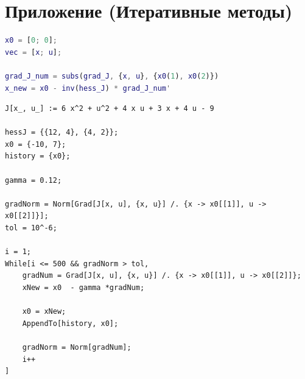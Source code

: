 \documentclass[a4paper,12pt]{article}
\begin{document}
\newpage
\section*{Приложение (Итеративные методы)}
\begin{lstlisting}[caption={Метод Ньютона (без цикла)}, language=matlab, label={lst:newton}]
x0 = [0; 0];
vec = [x; u];

grad_J_num = subs(grad_J, {x, u}, {x0(1), x0(2)})
x_new = x0 - inv(hess_J) * grad_J_num'
\end{lstlisting}

\begin{lstlisting}[caption={Метод наискорейшего спуска}, label={lst:grad_descent}]
J[x_, u_] := 6 x^2 + u^2 + 4 x u + 3 x + 4 u - 9

hessJ = {{12, 4}, {4, 2}};
x0 = {-10, 7};
history = {x0};

gamma = 0.12;

gradNorm = Norm[Grad[J[x, u], {x, u}] /. {x -> x0[[1]], u -> x0[[2]]}];
tol = 10^-6;

i = 1;
While[i <= 500 && gradNorm > tol,
	gradNum = Grad[J[x, u], {x, u}] /. {x -> x0[[1]], u -> x0[[2]]};
	xNew = x0  - gamma *gradNum;
	
	x0 = xNew;
	AppendTo[history, x0];
	
	gradNorm = Norm[gradNum];
	i++
]
\end{lstlisting}
	
\end{document}
